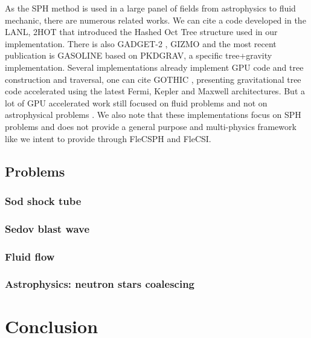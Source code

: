 As the SPH method is used in a large panel of fields from astrophysics to fluid mechanic, there are numerous related works. 
We can cite a code developed in the LANL, 2HOT \cite{warren20132hot} that introduced the Hashed Oct Tree structure used in our implementation. 
There is also GADGET-2 \cite{springel2005cosmological}, GIZMO \cite{hopkins2014gizmo} and the most recent publication is GASOLINE \cite{wadsley2017gasoline2} based on PKDGRAV, a specific tree+gravity implementation. 
Several implementations already implement GPU code and tree construction and traversal, one can cite GOTHIC \cite{miki2017gothic}, presenting gravitational tree code accelerated using the latest Fermi, Kepler and Maxwell architectures. But a lot of GPU accelerated work still focused on fluid problems and not on astrophysical problems  \cite{harada2007smoothed,crespo2011gpus}.
We also note that these implementations focus on SPH problems and does not provide a general purpose and multi-physics framework like we intent to provide through FleCSPH and FleCSI. 

\subsection{Problems}

\subsubsection{Sod shock tube}

\subsubsection{Sedov blast wave}

\subsubsection{Fluid flow}

\subsubsection{Astrophysics: neutron stars coalescing}

\section{Conclusion}
